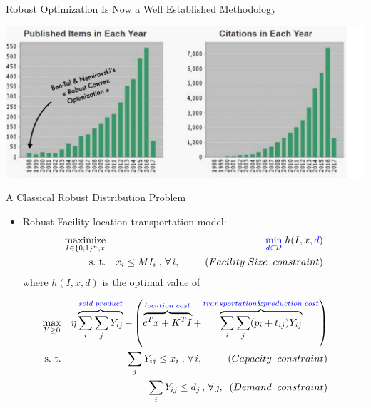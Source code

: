 \documentclass[xcolor=x11names,compress]{beamer}
\renewcommand{\(}{\begin{columns}}
\renewcommand{\)}{\end{columns}}
\newcommand{\<}[1]{\begin{column}{#1}}
\renewcommand{\>}{\end{column}}
\def\maximize{\mathop{\rm maximize}}
\def\subto{{\rm s. \mbox{ }\rm t.}}
\def\min{\mathop{\rm min}}
\def\max{\mathop{\rm max}}
\newcommand{\0}{\V{0}}
\newcommand{\1}{\V{1}}
\newcommand{\D}{\mathcal{D}}
\begin{document}
\begin{frame}{Robust Optimization Is Now a Well Established Methodology}

\includegraphics[width=1.1\textwidth]{ROcitations.pdf}

\end{frame}




\begin{frame}{A Classical Robust Distribution Problem}

\begin{itemize}
\item Robust Facility location-transportation  model:
\begin{eqnarray*}
\maximize_{I\in\{0,1\}^n,x} &&{\color{blue} \min_{d\in\D} }\;h(I,x,{\color{blue} d})\\
\subto&& x_i \leq MI_i \;,\,\forall\,i,\;\;\;\;\;\;\;\;\;(Facility\; Size \;\;constraint)
\end{eqnarray*}
where $h(I,x,d)$ is the optimal value of
\end{itemize}
\begin{eqnarray*}
\vspace{-0.5cm}\max_{Y\geq0} && \eta\overbrace{\sum_i\sum_j Y_{ij}}^{{\color{blue}sold\;product}}-\left(\overbrace{c^T x + K^TI}^{{\color{blue}location\;cost}}+\overbrace{\sum_i\sum_j (p_i+t_{ij})Y_{ij}}^{{\color{blue}transportation \& production\;cost}}\right)\\
\subto &&\sum_j Y_{ij}\le x_i \;,\,\forall\,i,\;\;\;\;\;\;\;\;\;(Capacity\;\;constraint)\\
&&\sum_i Y_{ij} \le d_j\,,\,\forall\,j,\;\;(Demand\;\;constraint)
\end{eqnarray*}



\end{frame}
\end{document}
